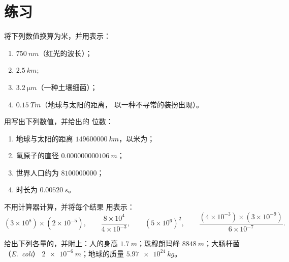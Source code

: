 \section{练习}

\begin{exercise}[$\star$]\label{exo:g10:orders-of-magnitude:1}
将下列数值换算为米，并用表示：
\begin{enumerate}
  \item $\qty{750}{nm}$（红光的波长）；
  \item $\qty{2.5}{km}$;
  \item $\qty{3.2}{\micro m}$（一种土壤细菌）；
  \item $\qty{0.15}{Tm}$（地球与太阳的距离，
        以一种不寻常的装扮出现）。
\end{enumerate}
\end{exercise}

\begin{exercise}[$\star$]\label{exo:g10:orders-of-magnitude:2}
用写出下列数值，并给出的
位数：
\begin{enumerate}
  \item 地球与太阳的距离 $\qty{149600000}{km}$，以米为；
  \item 氢原子的直径 $\qty{0.000000000106}{m}$；
  \item 世界人口约为 $\num{8100000000}$；
  \item 时长为 $\qty{0.00520}{s}$。
\end{enumerate}
\end{exercise}

\begin{exercise}[$\star$]\label{exo:g10:orders-of-magnitude:3}
不用计算器计算，并将每个结果
用表示：
\[
(3\times10^{8})\times(2\times10^{-5}), \qquad
\frac{8\times10^{4}}{4\times10^{-3}}, \qquad
(5\times10^{6})^{2}, \qquad
\frac{(4\times10^{-3})\times(3\times10^{-9})}{6\times10^{-7}} .
\]
\end{exercise}

\begin{exercise}[$\star$]\label{exo:g10:orders-of-magnitude:4}
给出下列各量的，并附上：人的身高
$\qty{1.7}{m}$；珠穆朗玛峰 $\qty{8848}{m}$；大肠杆菌（\emph{E.~coli}）
$\qty{2e-6}{m}$；地球的质量
$\qty{5.97e24}{kg}$。
\end{exercise}

